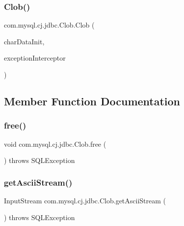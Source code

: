 \subsubsection{\texorpdfstring{Clob()}{Clob()}}
{\footnotesize\ttfamily com.\+mysql.\+cj.\+jdbc.\+Clob.\+Clob (\begin{DoxyParamCaption}\item[{String}]{char\+Data\+Init,  }\item[{\mbox{\hyperlink{interfacecom_1_1mysql_1_1cj_1_1exceptions_1_1_exception_interceptor}{Exception\+Interceptor}}}]{exception\+Interceptor }\end{DoxyParamCaption})}



\subsection{Member Function Documentation}
\mbox{\label{classcom_1_1mysql_1_1cj_1_1jdbc_1_1_clob_ab87f9b3eae069b4b8d7d78f3532c17ec}} 
\subsubsection{\texorpdfstring{free()}{free()}}
{\footnotesize\ttfamily void com.\+mysql.\+cj.\+jdbc.\+Clob.\+free (\begin{DoxyParamCaption}{ }\end{DoxyParamCaption}) throws S\+Q\+L\+Exception}

\mbox{\label{classcom_1_1mysql_1_1cj_1_1jdbc_1_1_clob_a207902fd33eb4765d5b102a6512a14fe}} 
\subsubsection{\texorpdfstring{get\+Ascii\+Stream()}{getAsciiStream()}}
{\footnotesize\ttfamily Input\+Stream com.\+mysql.\+cj.\+jdbc.\+Clob.\+get\+Ascii\+Stream (\begin{DoxyParamCaption}{ }\end{DoxyParamCaption}) throws S\+Q\+L\+Exception}

